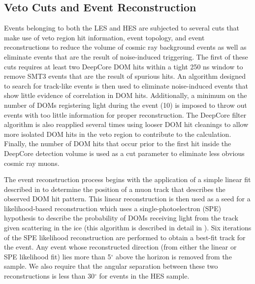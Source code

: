 \documentclass[manuscript]{aastex}
\begin{document}
\subsection{Veto Cuts and Event Reconstruction}
Events belonging to both the LES and HES are subjected to several cuts that make use of veto region hit information, event topology, and event reconstructions to reduce the volume of cosmic ray background events as well as eliminate events that are the result of noise-induced triggering. The first of these cuts requires at least two DeepCore DOM hits within a tight 250 ns window to remove SMT3 events that are the result of spurious hits. An algorithm designed to search for track-like events is then used to eliminate noise-induced events that show little evidence of correlation in DOM hits. Additionally, a minimum on the number of DOMs registering light during the event (10) is imposed to throw out events with too little information for proper reconstruction. The DeepCore filter algorithm is also reapplied several times using looser DOM hit cleanings to allow more isolated DOM hits in the veto region to contribute to the calculation. Finally, the number of DOM hits that occur prior to the first hit inside the DeepCore detection volume is used as a cut parameter to eliminate less obvious cosmic ray muons.

The event reconstruction process begins with the application of a simple linear fit described in \cite{2014NIMPA.736..143A} to determine the position of a muon track that describes the observed DOM hit pattern. This linear reconstruction is then used as a seed for a likelihood-based reconstruction which uses a single-photoelectron (SPE) hypothesis to describe the probability of DOMs receiving light from the track given scattering in the ice (this algorithm is described in detail in \cite{2004NIMPA.524..169A}). Six iterations of the SPE likelihood reconstruction are performed to obtain a best-fit track for the event. Any event whose reconstructed direction (from either the linear or SPE likelihood fit) lies more than 5$^{\circ}$ above the horizon is removed from the sample. We also require that the angular separation between these two reconstructions is less than 30$^{\circ}$ for events in the HES sample.
\end{document}
